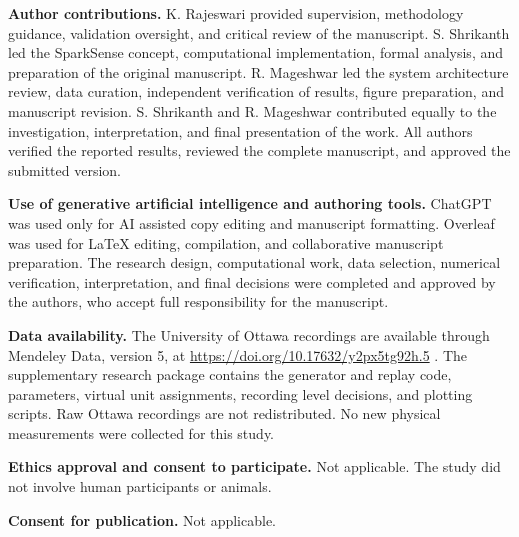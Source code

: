 \documentclass[10pt,twocolumn]{article}
\begin{document}
\textbf{Author contributions.} K. Rajeswari provided supervision, methodology guidance, validation oversight, and critical review of the manuscript. S. Shrikanth led the SparkSense concept, computational implementation, formal analysis, and preparation of the original manuscript. R. Mageshwar led the system architecture review, data curation, independent verification of results, figure preparation, and manuscript revision. S. Shrikanth and R. Mageshwar contributed equally to the investigation, interpretation, and final presentation of the work. All authors verified the reported results, reviewed the complete manuscript, and approved the submitted version.

\textbf{Use of generative artificial intelligence and authoring tools.} ChatGPT was used only for AI assisted copy editing and manuscript formatting. Overleaf was used for LaTeX editing, compilation, and collaborative manuscript preparation. The research design, computational work, data selection, numerical verification, interpretation, and final decisions were completed and approved by the authors, who accept full responsibility for the manuscript.

\textbf{Data availability.} The University of Ottawa recordings are available through Mendeley Data, version 5, at \url{https://doi.org/10.17632/y2px5tg92h.5} \cite{sehri2023dataset}. The supplementary research package contains the generator and replay code, parameters, virtual unit assignments, recording level decisions, and plotting scripts. Raw Ottawa recordings are not redistributed. No new physical measurements were collected for this study.

\textbf{Ethics approval and consent to participate.} Not applicable. The study did not involve human participants or animals.

\textbf{Consent for publication.} Not applicable.
\end{document}
